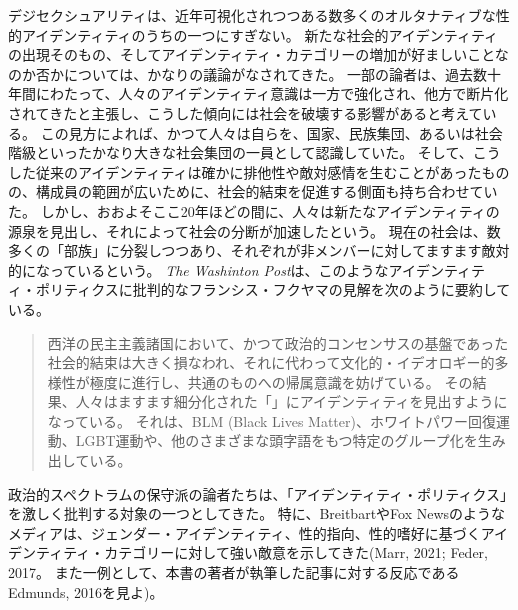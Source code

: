 \documentclass[paper=a4,book,openany]{jlreq}
\begin{document}
デジセクシュアリティは、近年可視化されつつある数多くのオルタナティブな性的アイデンティティのうちの一つにすぎない。
新たな社会的アイデンティティの出現そのもの、そしてアイデンティティ・カテゴリーの増加が好ましいことなのか否かについては、かなりの議論がなされてきた。
一部の論者は、過去数十年間にわたって、人々のアイデンティティ意識は一方で強化され、他方で断片化されてきたと主張し、こうした傾向には社会を破壊する影響があると考えている。
この見方によれば、かつて人々は自らを、国家、民族集団、あるいは社会階級といったかなり大きな社会集団の一員として認識していた。
そして、こうした従来のアイデンティティは確かに排他性や敵対感情を生むことがあったものの、構成員の範囲が広いために、社会的結束を促進する側面も持ち合わせていた。
しかし、おおよそここ20年ほどの間に、人々は新たなアイデンティティの源泉を見出し、それによって社会の分断が加速したという。
現在の社会は、数多くの「部族」に分裂しつつあり、それぞれが非メンバーに対してますます敵対的になっているという。
\emph{The Washinton Post}は、このようなアイデンティティ・ポリティクスに批判的なフランシス・フクヤマの見解を次のように要約している。

\begin{quote}
西洋の民主主義諸国において、かつて政治的コンセンサスの基盤であった社会的結束は大きく損なわれ、それに代わって文化的・イデオロギー的多様性が極度に進行し、共通のものへの帰属意識を妨げている。
その結果、人々はますます細分化された「」にアイデンティティを見出すようになっている。
それは、BLM (Black Lives Matter)、ホワイトパワー回復運動、LGBT運動や、他のさまざまな頭字語をもつ特定のグループ化を生み出している。
\citep{gardels18:_franc_fukuy}
\end{quote}

政治的スペクトラムの保守派の論者たちは、「アイデンティティ・ポリティクス」を激しく批判する対象の一つとしてきた。
特に、BreitbartやFox Newsのようなメディアは、ジェンダー・アイデンティティ、性的指向、性的嗜好に基づくアイデンティティ・カテゴリーに対して強い敵意を示してきた(Marr, 2021; Feder, 2017。
また一例として、本書の著者が執筆した記事に対する反応であるEdmunds, 2016を見よ)。
\nocite{edmunds16:_eco_sexual_boast_mastur_water}
\nocite{marr21:_fox_news_has_consis_enabl,feder17:_steve_bannon_gay_agend}
\end{document}
